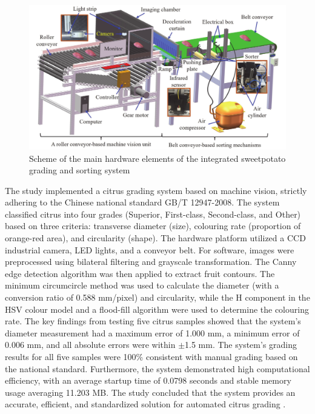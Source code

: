 {\begin{figure}[ht]
	\centering
	\includegraphics[width=0.7\linewidth]{figures/Xu2024}
	\caption{Scheme of the main hardware elements of the integrated sweetpotato grading and sorting system \citep{xu2024design}}
	\label{fig:Xu2024}
\end{figure}


The study implemented a citrus grading system based on machine vision, strictly adhering to the Chinese national standard GB/T 12947-2008. The system classified citrus into four grades (Superior, First-class, Second-class, and Other) based on three criteria: transverse diameter (size), colouring rate (proportion of orange-red area), and circularity (shape). The hardware platform utilized a CCD industrial camera, LED lights, and a conveyor belt. For software, images were preprocessed using bilateral filtering and grayscale transformation. The Canny edge detection algorithm was then applied to extract fruit contours. The minimum circumcircle method was used to calculate the diameter (with a conversion ratio of 0.588 mm/pixel) and circularity, while the H component in the HSV colour model and a flood-fill algorithm were used to determine the colouring rate. The key findings from testing five citrus samples showed that the system's diameter measurement had a maximum error of 1.000 mm, a minimum error of 0.006 mm, and all absolute errors were within $\pm$1.5 mm. The system’s grading results for all five samples were 100\% consistent with manual grading based on the national standard. Furthermore, the system demonstrated high computational efficiency, with an average startup time of 0.0798 seconds and stable memory usage averaging 11.203 MB. The study concluded that the system provides an accurate, efficient, and standardized solution for automated citrus grading \citep{xu2025research}.


}
